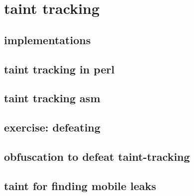 \section{taint tracking}


\subsection{implementations}


\subsection{taint tracking in perl}


\subsection{taint tracking asm}


\subsection{exercise: defeating} 


\subsection{obfuscation to defeat taint-tracking}


\subsection{taint for finding mobile leaks}


